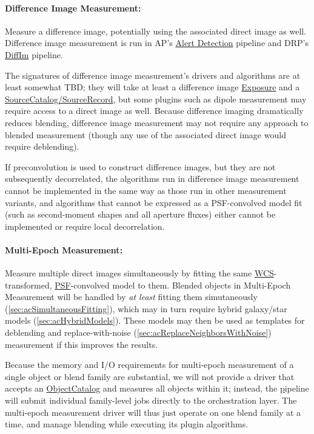 \paragraph{Difference Image Measurement:} Measure a difference image, potentially using the associated direct image as well.  Difference image measurement is run in AP's \hyperref[sec:apAlertDetection]{Alert Detection} pipeline and DRP's \hyperref[sec:drpDiffIm]{DiffIm} pipeline.
\label{sec:acDiffImMeasurement}

The signatures of difference image measurement's drivers and algorithms are at least somewhat TBD; they will take at least a difference image \hyperref[sec:spImagesExposure]{Exposure} and a \hyperref[sec:spTablesSource]{SourceCatalog/SourceRecord}, but some plugins such as dipole measurement may require access to a direct image as well.  Because difference imaging dramatically reduces blending, difference image measurement may not require any approach to blended measurement (though any use of the associated direct image would require deblending).

If preconvolution is used to construct difference images, but they are not subsequently decorrelated, the algorithms run in difference image measurement cannot be implemented in the same way as those run in other measurement variants, and algorithms that cannot be expressed as a PSF-convolved model fit (such as second-moment shapes and all aperture fluxes) either cannot be implemented or require local decorrelation.

\paragraph{Multi-Epoch Measurement:} Measure multiple direct images simultaneously by fitting the same \hyperref[sec:spWCS]{WCS}-transformed, \hyperref[sec:spPSF]{PSF}-convolved model to them.  Blended objects in Multi-Epoch Measurement will be handled by \emph{at least} fitting them simutaneously (\ref{sec:acSimultaneousFitting}), which may in turn require hybrid galaxy/star models (\ref{sec:acHybridModels}).  These models may then be used as templates for deblending and replace-with-noise (\ref{sec:acReplaceNeighborsWithNoise}) measurement if this improves the results.
\label{sec:acMultiEpochMeasurement}

Because the memory and I/O requirements for multi-epoch measurement of a single object or blend family are substantial, we will not provide a driver that accepts an \hyperref[sec:spTablesObject]{ObjectCatalog} and measures all objects within it; instead, the \hyperref[sec:drpMultiFit] pipeline will submit individual family-level jobs directly to the orchestration layer.  The multi-epoch measurement driver will thus just operate on one blend family at a time, and manage blending while executing its plugin algorithms.

